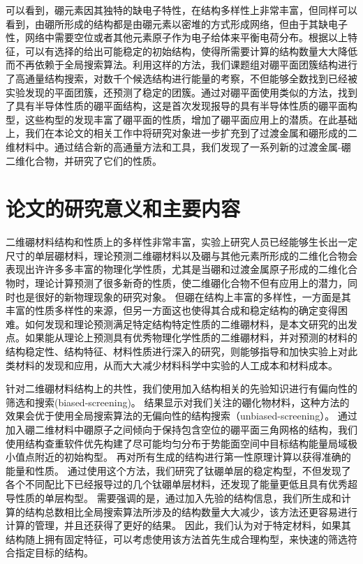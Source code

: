 可以看到，硼元素因其独特的缺电子特性，在结构多样性上非常丰富，但同样可以看到，由硼所形成的结构都是由硼元素以密堆的方式形成网络，但由于其缺电子性，网络中需要空位或者其他元素原子作为电子给体来平衡电荷分布。根据以上特征，可以有选择的给出可能稳定的初始结构，使得所需要计算的结构数量大大降低而不再依赖于全局搜索算法。利用这样的方法，我们课题组对硼平面团簇结构进行了高通量结构搜索，对数千个候选结构进行能量的考察，不但能够全数找到已经被实验发现的平面团簇，还预测了稳定的团簇\cite{xu2017practical}。通过对硼平面使用类似的方法，找到了具有半导体性质的硼平面结构\cite{xu2017two}，这是首次发现报导的具有半导体性质的硼平面构型，这些构型的发现丰富了硼平面的性质，增加了硼平面应用上的潜质。在此基础上，我们在本论文的相关工作中将研究对象进一步扩充到了过渡金属和硼形成的二维材料中。通过结合新的高通量方法和工具，我们发现了一系列新的过渡金属-硼二维化合物，并研究了它们的性质。

\section{论文的研究意义和主要内容}
二维硼材料结构和性质上的多样性非常丰富，实验上研究人员已经能够生长出一定尺寸的单层硼材料，理论预测二维硼材料以及硼与其他元素所形成的二维化合物会表现出许许多多丰富的物理化学性质，尤其是当硼和过渡金属原子形成的二维化合物时，理论计算预测了很多新奇的性质，使二维硼化合物不但有应用上的潜力，同时也是很好的新物理现象的研究对象。
但硼在结构上丰富的多样性，一方面是其丰富的性质多样性的来源，但另一方面这也使得其合成和稳定结构的确定变得困难。如何发现和理论预测满足特定结构特定性质的二维硼材料，是本文研究的出发点。如果能从理论上预测具有优秀物理化学性质的二维硼材料，并对预测的材料的结构稳定性、结构特征、材料性质进行深入的研究，则能够指导和加快实验上对此类材料的发现和应用，从而大大减少材料科学中实验的人工成本和材料成本。

针对二维硼材料结构上的共性，我们使用加入结构相关的先验知识进行有偏向性的筛选和搜索(biased-screening)。
结果显示对我们关注的硼化物材料，这种方法的效果会优于使用全局搜索算法的无偏向性的结构搜索（unbiased-screening）。
通过加入硼二维材料中硼原子之间倾向于保持包含空位的硼平面三角网格的结构，我们使用结构查重软件优先构建了尽可能均匀分布于势能面空间中目标结构能量局域极小值点附近的初始构型。
再对所有生成的结构进行第一性原理计算以获得准确的能量和性质。
通过使用这个方法，我们研究了钛硼单层的稳定构型，不但发现了各个不同配比下已经报导过的几个钛硼单层材料，还发现了能量更低且具有优秀超导性质的单层构型。
需要强调的是，通过加入先验的结构信息，我们所生成和计算的结构总数相比全局搜索算法所涉及的结构数量大大减少，该方法还更容易进行计算的管理，并且还获得了更好的结果。
因此，我们认为对于特定材料，如果其结构随上拥有固定特征，可以考虑使用该方法首先生成合理构型，来快速的筛选符合指定目标的结构。

